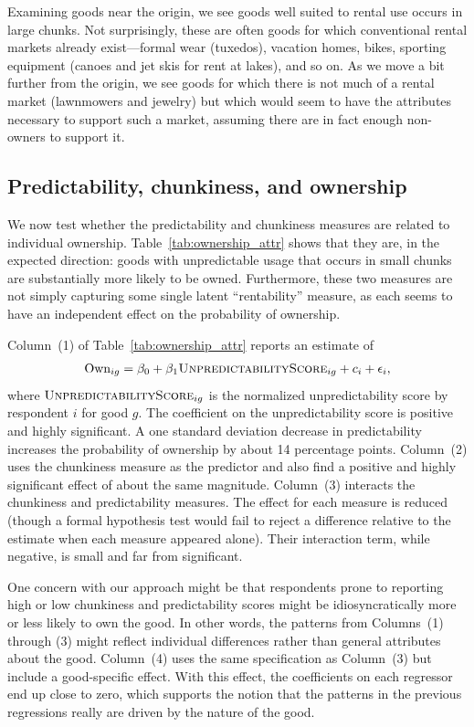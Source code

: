 \documentclass[12pt]{article}
\begin{document}
Examining goods near the origin, we see goods well suited to rental use occurs in large chunks. 
Not surprisingly, these are often goods for which conventional rental markets already exist---formal wear (tuxedos), vacation homes, bikes, sporting equipment (canoes and jet skis for rent at lakes), and so on.
As we move a bit further from the origin, we see goods for which there is not much of a rental market (lawnmowers and jewelry) but which would seem to have the attributes necessary to support such a market, assuming there are in fact enough non-owners to support it.  

\subsection{Predictability, chunkiness, and ownership} 
We now test whether the predictability and chunkiness measures are related to individual ownership. 
Table~\ref{tab:ownership_attr} shows that they are, in the expected direction:
goods with unpredictable usage that occurs in small chunks are substantially more likely to be owned.
Furthermore, these two measures are not simply capturing some single latent ``rentability'' measure, as each seems to have an independent effect on the probability of ownership. 

 

Column~(1) of Table~\ref{tab:ownership_attr} reports an estimate of 
\begin{align}
  \text{Own}_{ig} = \beta_0 + \beta_1 \textsc{UnpredictabilityScore}_{ig} + c_i + \epsilon_i,
\end{align} 
where $\textsc{UnpredictabilityScore}_{ig}$ is the normalized unpredictability score by respondent $i$ for good $g$.
The coefficient on the unpredictability score is positive and highly significant.
A one standard deviation decrease in predictability increases the probability of ownership by about 14 percentage points. 
Column~(2) uses the chunkiness measure as the predictor and also find a positive and highly significant effect of about the same magnitude. 
Column~(3) interacts the chunkiness and predictability measures.
The effect for each measure is reduced (though a formal hypothesis test would fail to reject a difference relative to the estimate when each measure appeared alone).
Their interaction term, while negative, is small and far from significant.

One concern with our approach might be that respondents prone to reporting high or low chunkiness and predictability scores might be idiosyncratically more or less likely to own the good.
In other words, the patterns from Columns~(1) through (3) might reflect individual differences rather than general attributes about the good.
Column~(4) uses the same specification as Column~(3) but include a good-specific effect.
With this effect, the coefficients on each regressor end up close to zero, which supports the notion that the patterns in the previous regressions really are driven by the nature of the good. 
\end{document}
